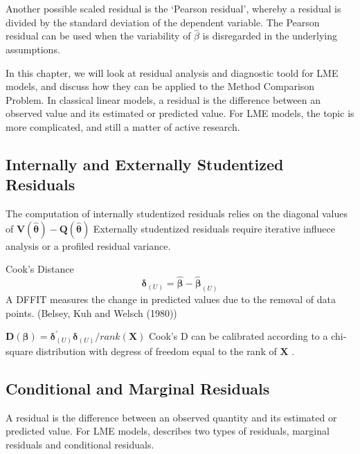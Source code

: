 \documentclass[12pt, a4paper]{report}
\theoremstyle{plain}
\theoremstyle{definition}
\theoremstyle{remark}
\begin{document}
Another possible scaled residual is the  `Pearson residual', whereby a residual is divided by the standard deviation of the dependent variable. The Pearson residual can be used when the variability of $\hat{\beta}$ is disregarded in the underlying assumptions.



	

In this chapter, we will look at residual analysis and diagnostic toold for LME models, and discuss how they can be applied to the Method Comparison Problem.	In classical linear models, a residual is the difference between an observed value and its estimated or predicted value. For LME models, the topic is more complicated, and still a matter of active research. 


\subsection{Internally and Externally Studentized Residuals}
The computation of internally studentized residuals relies on the diagonal values of $\boldsymbol{V(\hat{\theta})} - \boldsymbol{Q(\hat{\theta})}$
Externally studentized residuals require iterative influece analysis or a profiled residual variance.

Cook's Distance
\[ \boldsymbol{\delta}_{(U)} = \boldsymbol{\hat{\beta}}  - \boldsymbol{\hat{\beta}}_{(U)} \]
A DFFIT measures the change in predicted values due to the removal of data points.
(Belsey, Kuh and Welsch (1980))

$\boldsymbol{D(\beta)}  = \boldsymbol{\delta}^{\prime}_{(U)} \boldsymbol{\delta}_{(U)} / rank(\boldsymbol{X})$
Cook's D can be calibrated according to a chi-square distribution with degress of freedom equal to the rank of $\boldsymbol{X}$ \citet{CPJ}.



\subsection{Conditional and Marginal Residuals}
A residual is the difference between an observed quantity and its estimated or predicted value. For LME models, \citet{schab} describes two types of residuals, marginal residuals and conditional residuals. 
\end{document}
